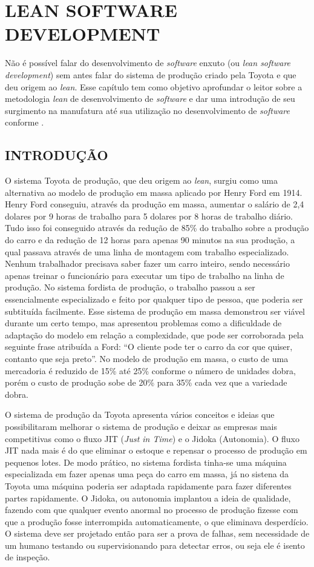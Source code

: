 \chapter{LEAN SOFTWARE DEVELOPMENT}
\label{cha:lean}

Não é possível falar do desenvolvimento de \textit{software} enxuto (ou \textit{lean software development}) sem antes falar do sistema de produção criado pela Toyota e que deu origem ao \textit{lean}. Esse capítulo tem como objetivo aprofundar o leitor sobre a metodologia \textit{lean} de desenvolvimento de \textit{software} e dar uma introdução de seu surgimento na manufatura até sua utilização no desenvolvimento de \textit{software} conforme .
\label{lean}
\section{INTRODUÇÃO}

O sistema Toyota de produção, que deu origem ao \textit{lean}, surgiu como uma alternativa ao modelo de produção em massa aplicado por Henry Ford em 1914. Henry Ford conseguiu, através da produção em massa, aumentar o salário de 2,4 dolares por 9 horas de trabalho para 5 dolares por 8 horas de trabalho diário. Tudo isso foi conseguido através da redução de 85\% do trabalho sobre a produção do carro e da redução de 12 horas para apenas 90 minutos na sua produção, a qual passava através de uma linha de montagem com trabalho especializado. Nenhum trabalhador precisava saber fazer um carro inteiro, sendo necessário apenas treinar o funcionário para executar um tipo de trabalho na linha de produção. No sistema fordista de produção, o trabalho passou a ser essencialmente especializado e feito por qualquer tipo de pessoa, que poderia ser subtituída facilmente. Esse sistema de produção em massa demonstrou ser viável durante um certo tempo, mas apresentou problemas como a dificuldade de adaptação do modelo em relação a complexidade, que pode ser corroborada pela seguinte frase atribuída a Ford: ``O cliente pode ter o carro da cor que quiser, contanto que seja preto''. No modelo de produção em massa, o custo de uma mercadoria é reduzido de 15\% até 25\% conforme o número de unidades dobra, porém o custo de produção sobe de 20\% para 35\% cada vez que a variedade dobra.

O sistema de produção da Toyota apresenta vários conceitos e ideias que possibilitaram melhorar o sistema de produção e deixar as empresas mais competitivas como o fluxo JIT (\textit{Just in Time}) e o Jidoka (Autonomia). O fluxo JIT nada mais é do que eliminar o estoque e repensar o processo de produção em pequenos lotes. De modo prático, no sistema fordista tinha-se uma máquina especializada em fazer apenas uma peça do carro em massa, já no sistena da Toyota uma máquina poderia ser adaptada rapidamente para fazer diferentes partes rapidamente. O Jidoka, ou autonomia implantou a ideia de qualidade, fazendo com que qualquer evento anormal no processo de produção fizesse com que a produção fosse interrompida automaticamente, o que eliminava desperdício. O sistema deve ser projetado então para ser a prova de falhas, sem necessidade de um humano testando ou supervisionando para detectar erros, ou seja ele é isento de inspeção.

